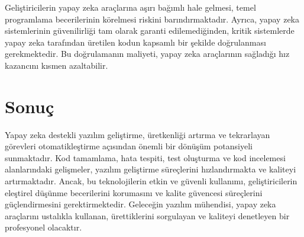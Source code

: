 \documentclass[
    language=turkish,
    doctype=article,
]{../../omnilatex}
\begin{document}
Geliştiricilerin yapay zeka araçlarına aşırı bağımlı hale gelmesi, temel programlama becerilerinin körelmesi riskini barındırmaktadır. Ayrıca, yapay zeka sistemlerinin güvenilirliği tam olarak garanti edilemediğinden, kritik sistemlerde yapay zeka tarafından üretilen kodun kapsamlı bir şekilde doğrulanması gerekmektedir. Bu doğrulamanın maliyeti, yapay zeka araçlarının sağladığı hız kazancını kısmen azaltabilir.

\section{Sonuç}
Yapay zeka destekli yazılım geliştirme, üretkenliği artırma ve tekrarlayan görevleri otomatikleştirme açısından önemli bir dönüşüm potansiyeli sunmaktadır. Kod tamamlama, hata tespiti, test oluşturma ve kod incelemesi alanlarındaki gelişmeler, yazılım geliştirme süreçlerini hızlandırmakta ve kaliteyi artırmaktadır. Ancak, bu teknolojilerin etkin ve güvenli kullanımı, geliştiricilerin eleştirel düşünme becerilerini korumasını ve kalite güvencesi süreçlerini güçlendirmesini gerektirmektedir. Geleceğin yazılım mühendisi, yapay zeka araçlarını ustalıkla kullanan, ürettiklerini sorgulayan ve kaliteyi denetleyen bir profesyonel olacaktır.
\end{document}
